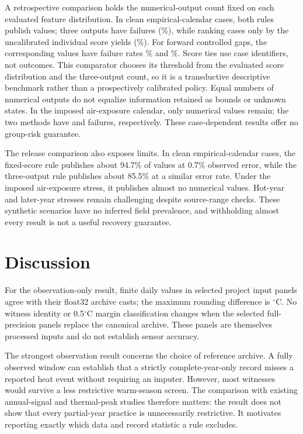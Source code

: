 \documentclass[draft,linenumbers]{agujournal2025}
\begin{document}
A retrospective comparison holds the numerical-output count fixed on each evaluated feature distribution. In clean empirical-calendar cases, both rules publish \MRCount{} values; three outputs have \MRThreeBad{} failures (\MRThreeRisk\%), while ranking cases only by the uncalibrated individual score yields \MRScoreBad{} (\MRScoreRisk\%). For forward controlled gaps, the corresponding \MRFutureCount{} values have failure rates \MRFutureThree\% and \MRFutureScore\%. Score ties use case identifiers, not outcomes. This comparator chooses its threshold from the evaluated score distribution and the three-output count, so it is a transductive descriptive benchmark rather than a prospectively calibrated policy. Equal numbers of numerical outputs do not equalize information retained as bounds or unknown states. In the imposed air-exposure calendar, only \MRAirCount{} numerical values remain; the two methods have \MRAirThreeBad{} and \MRAirScoreBad{} failures, respectively. These case-dependent results offer no group-risk guarantee.

The release comparison also exposes limits. In clean empirical-calendar cases, the fixed-score rule publishes about 94.7\% of values at 0.7\% observed error, while the three-output rule publishes about 85.5\% at a similar error rate. Under the imposed air-exposure stress, it publishes almost no numerical values. Hot-year and later-year stresses remain challenging despite source-range checks. These synthetic scenarios have no inferred field prevalence, and withholding almost every result is not a useful recovery guarantee.

\section{Discussion}
For the observation-only result, \IPDays{} finite daily values in \IPPanels{} selected project input panels agree with their float32 archive casts; the maximum rounding difference is \IPRounding{}$^{\circ}$C. No witness identity or 0.5$^{\circ}$C margin classification changes when the selected full-precision panels replace the canonical archive. These panels are themselves processed inputs and do not establish sensor accuracy.

The strongest observation result concerns the choice of reference archive. A fully observed window can establish that a strictly complete-year-only record misses a reported heat event without requiring an imputer. However, most witnesses would survive a less restrictive warm-season screen. The comparison with existing annual-signal and thermal-peak studies therefore matters: the result does not show that every partial-year practice is unnecessarily restrictive. It motivates reporting exactly which data and record statistic a rule excludes.
\end{document}
